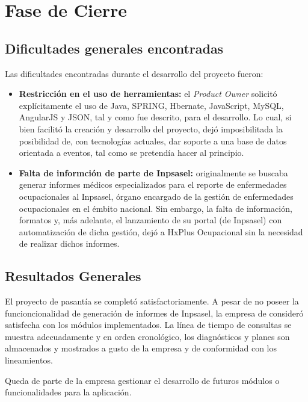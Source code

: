     
\section{Fase de Cierre}

\subsection{Dificultades generales encontradas}

    Las dificultades encontradas durante el desarrollo del proyecto fueron:
    
    \begin{itemize}
        \item \textbf{Restricción en el uso de herramientas:} el \textit{Product Owner} solicitó explícitamente el uso de Java, SPRING, Hbernate, JavaScript, MySQL, AngularJS y JSON, tal y como fue descrito, para el desarrollo. Lo cual, si bien facilitó la creación y desarrollo del proyecto, dejó imposibilitada la posibilidad de, con tecnologías actuales, dar soporte a una base de datos orientada a eventos, tal como se pretendía hacer al principio.
        
        \item \textbf{Falta de informción de parte de Inpsasel:} originalmente se buscaba generar informes médicos especializados para el reporte de enfermedades ocupacionales al Inpsasel, órgano encargado de la gestión de enfermedades ocupacionales en el émbito nacional. Sin embargo, la falta de información, formatos y, más adelante, el lanzamiento de su portal (de Inpsasel) con automatización de dicha gestión, dejó a HxPlus Ocupacional sin la necesidad de realizar dichos informes.
    \end{itemize}
    
    \subsection{Resultados Generales}
    
    El proyecto de pasantía se completó satisfactoriamente. A pesar de no poseer la funcioncionalidad de generación de informes de Inpsasel, la empresa de consideró satisfecha con los módulos implementados. La línea de tiempo de consultas se muestra adecuadamente y en orden cronológico, los diagnósticos y planes son almacenados y mostrados a gusto de la empresa y de conformidad con los lineamientos.
    
    Queda de parte de la empresa gestionar el desarrollo de futuros módulos o funcionalidades para la aplicación.
        